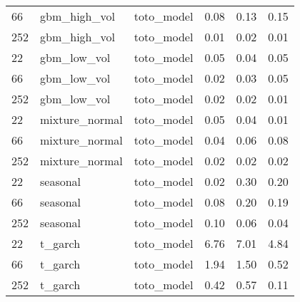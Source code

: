 {\begin{tabular}{lllrrr}
66 & gbm\_high\_vol & toto\_model & 0.08 & 0.13 & 0.15 \\
252 & gbm\_high\_vol & toto\_model & 0.01 & 0.02 & 0.01 \\
\midrule
22 & gbm\_low\_vol & toto\_model & 0.05 & 0.04 & 0.05 \\
66 & gbm\_low\_vol & toto\_model & 0.02 & 0.03 & 0.05 \\
252 & gbm\_low\_vol & toto\_model & 0.02 & 0.02 & 0.01 \\
\midrule
22 & mixture\_normal & toto\_model & 0.05 & 0.04 & 0.01 \\
66 & mixture\_normal & toto\_model & 0.04 & 0.06 & 0.08 \\
252 & mixture\_normal & toto\_model & 0.02 & 0.02 & 0.02 \\
\midrule
22 & seasonal & toto\_model & 0.02 & 0.30 & 0.20 \\
66 & seasonal & toto\_model & 0.08 & 0.20 & 0.19 \\
252 & seasonal & toto\_model & 0.10 & 0.06 & 0.04 \\
\midrule
22 & t\_garch & toto\_model & 6.76 & 7.01 & 4.84 \\
66 & t\_garch & toto\_model & 1.94 & 1.50 & 0.52 \\
252 & t\_garch & toto\_model & 0.42 & 0.57 & 0.11 \\
\bottomrule
\end{tabular}
}